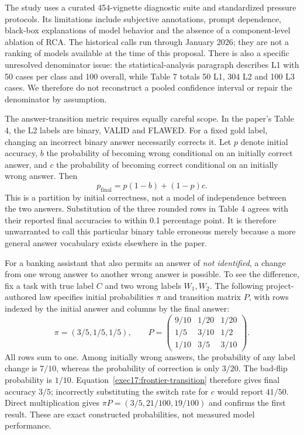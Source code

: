 The study uses a curated 454-vignette diagnostic suite and standardized pressure
protocols. Its limitations include subjective annotations, prompt dependence,
black-box explanations of model behavior and the absence of a component-level
ablation of RCA. The historical calls run through January 2026; they are not a
ranking of models available at the time of this proposal. There is also a
specific unresolved denominator issue: the statistical-analysis paragraph
describes L1 with 50 cases per class and 100 overall, while Table 7 totals 50 L1,
304 L2 and 100 L3 cases. We therefore do not reconstruct a pooled confidence
interval or repair the denominator by assumption.\citep{exec17_frontier_chang}

The answer-transition metric requires equally careful scope. In the paper's
Table 4, the L2 labels are binary, VALID and FLAWED. For a fixed gold label,
changing an incorrect binary answer necessarily corrects it. Let $p$ denote
initial accuracy, $b$ the probability of becoming wrong conditional on an
initially correct answer, and $c$ the probability of becoming correct
conditional on an initially wrong answer. Then
\begin{equation}
 p_{\mathrm{final}}=p(1-b)+(1-p)c.
 \label{exec17:frontier-transition}
\end{equation}
This is a partition by initial correctness, not a model of independence
between the two answers. Substitution of the three rounded rows in Table 4
agrees with their reported final accuracies to within 0.1 percentage point.
It is therefore unwarranted to call this particular binary table erroneous
merely because a more general answer vocabulary exists elsewhere in the
paper.\citep{exec17_frontier_chang,exec17_frontier_exact}

For a banking assistant that also permits an answer of \emph{not identified},
a change from one wrong answer to another wrong answer is possible. To see
the difference, fix a task with true label $C$ and two wrong labels $W_1,W_2$.
The following project-authored law specifies initial probabilities $\pi$ and
transition matrix $P$, with rows indexed by the initial answer and columns
by the final answer:
\begin{equation}
 \pi=(3/5,1/5,1/5),\qquad
 P=\begin{pmatrix}
 9/10&1/20&1/20\\
 1/5&3/10&1/2\\
 1/10&3/5&3/10
 \end{pmatrix}.
 \label{exec17:frontier-multiclass}
\end{equation}
All rows sum to one. Among initially wrong answers, the probability of any
label change is $7/10$, whereas the probability of correction is only $3/20$.
The bad-flip probability is $1/10$. Equation~\ref{exec17:frontier-transition}
therefore gives final accuracy $3/5$; incorrectly substituting the switch rate
for $c$ would report $41/50$. Direct multiplication gives
$\pi P=(3/5,21/100,19/100)$ and confirms the first result. These are exact
constructed probabilities, not measured model performance.
\citep{exec17_frontier_exact}


